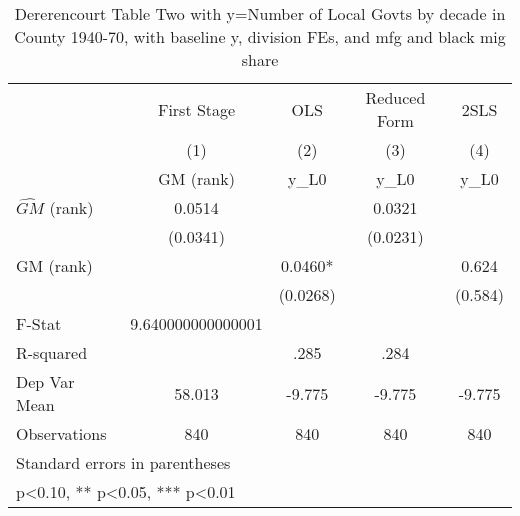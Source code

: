 \begin{table}[htbp]\centering
\def\sym#1{\ifmmode^{#1}\else\(^{#1}\)\fi}
\caption{Dererencourt Table Two with y=Number of Local Govts by decade in County 1940-70, with baseline y, division FEs, and mfg and black mig share}
\begin{tabular}{l*{4}{c}}
\toprule
                    & First Stage   &         OLS   &Reduced Form   &        2SLS   \\
                    &\multicolumn{1}{c}{(1)}&\multicolumn{1}{c}{(2)}&\multicolumn{1}{c}{(3)}&\multicolumn{1}{c}{(4)}\\
                    &\multicolumn{1}{c}{GM  (rank)}&\multicolumn{1}{c}{y\_L0}&\multicolumn{1}{c}{y\_L0}&\multicolumn{1}{c}{y\_L0}\\
\midrule
$\hat{GM}$ (rank)   &      0.0514   &               &      0.0321   &               \\
                    &    (0.0341)   &               &    (0.0231)   &               \\
\addlinespace
GM  (rank)          &               &      0.0460*  &               &       0.624   \\
                    &               &    (0.0268)   &               &     (0.584)   \\
\midrule
F-Stat              &9.640000000000001   &               &               &               \\
R-squared           &               &        .285   &        .284   &               \\
Dep Var Mean        &      58.013   &      -9.775   &      -9.775   &      -9.775   \\
Observations        &         840   &         840   &         840   &         840   \\
\bottomrule
\multicolumn{5}{l}{\footnotesize Standard errors in parentheses}\\
\multicolumn{5}{l}{\footnotesize * p<0.10, ** p<0.05, *** p<0.01}\\
\end{tabular}
\end{table}

